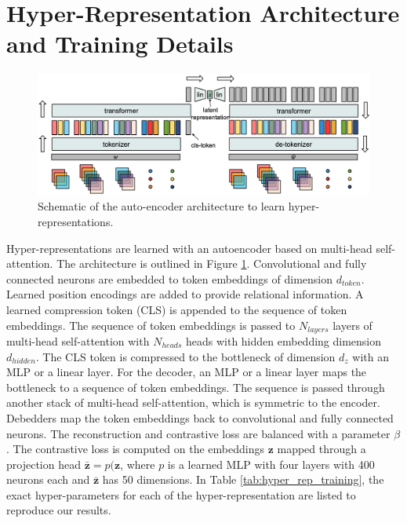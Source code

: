 \section{Hyper-Representation Architecture and Training Details}
\label{app:training}
\begin{figure}[ht!]
\begin{minipage}[t]{1.0\textwidth}
\begin{center}
\includegraphics[trim=0in 0in 0in 0in, width=0.99\linewidth]{figures/hyper_rep_architecture_v3.png}
\caption{
Schematic of the auto-encoder architecture to learn hyper-representations. 
}
\label{fig:autoencoder_architecture}    
\end{center}
\end{minipage}
\end{figure}
Hyper-representations are learned with an autoencoder based on multi-head self-attention. The architecture is outlined in Figure \ref{fig:autoencoder_architecture}. 
Convolutional and fully connected neurons are embedded to token embeddings of dimension $d_{token}$. 
Learned position encodings are added to provide relational information.
A learned compression token (CLS) is appended to the sequence of token embeddings. 
The sequence of token embeddings is passed to $N_{layers}$ layers of multi-head self-attention with $N_{heads}$ heads with hidden embedding dimension $d_{hidden}$. 
The CLS token is compressed to the bottleneck of dimension $d_{z}$ with an MLP or a linear layer.
For the decoder, an MLP or a linear layer maps the bottleneck to a sequence of token embeddings.
The sequence is passed through another stack of multi-head self-attention, which is symmetric to the encoder.
Debedders map the token embeddings back to convolutional and fully connected neurons.
The reconstruction and contrastive loss are balanced with a parameter $\beta$. The contrastive loss is computed on the embeddings $\mathbf{z}$ mapped through a projection head $\mathbf{\bar{z}}=p(\mathbf{z}$, where $p$ is a learned MLP with four layers with 400 neurons each and $\mathbf{\bar{z}}$ has 50 dimensions.
In Table \ref{tab:hyper_rep_training}, the exact hyper-parameters for each of the hyper-representation are listed to reproduce our results.


